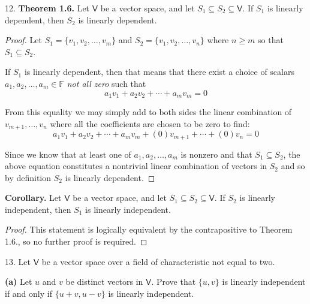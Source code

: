\documentclass[11pt]{article}
\newcommand{\cbr}[1]{\{#1\}}
\begin{document}
12. \textbf{Theorem 1.6.} Let $\mathsf{V}$ be a vector space, and let $S_1\subseteq S_2 \subseteq \mathsf{V}$. If $S_1$ is linearly dependent, then $S_2$ is linearly dependent.

\begin{proof} Let $S_1 = \cbr{v_1,v_2,\dots,v_m}$ and $S_2 = \cbr{v_1,v_2,\dots,v_n}$ where $n\geq m$ so that $S_1\subseteq S_2$.

    If $S_1$ is linearly dependent, then that means that there exist a choice of scalars $a_1,a_2,\dots,a_m\in\mathbb{F}$ \textit{not all zero} such that $$a_1v_1+a_2v_2+\cdots+a_mv_m = 0$$

    From this equality we may simply add to both sides the linear combination of $v_{m+1},\dots,v_n$ where all the coefficients are chosen to be zero to find:
    $$a_1v_1+a_2v_2+\cdots+a_mv_m + (0)v_{m+1} + \cdots + (0)v_n = 0$$

    Since we know that at least one of $a_1,a_2,\dots,a_m$ is nonzero and that $S_1\subseteq S_2$, the above equation constitutes a nontrivial linear combination of vectors in $S_2$ and so by definition $S_2$ is linearly dependent.
\end{proof}

\textbf{Corollary.} Let $\mathsf{V}$ be a vector space, and let $S_1\subseteq S_2 \subseteq \mathsf{V}$. If $S_2$ is linearly independent, then $S_1$ is linearly independent.

\begin{proof}
    This statement is logically equivalent by the contrapositive to Theorem 1.6., so no further proof is required.
\end{proof}

13. Let $\mathsf{V}$ be a vector space over a field of characteristic not equal to two.

\textbf{(a)} Let $u$ and $v$ be distinct vectors in $\mathsf{V}$. Prove that $\cbr{u,v}$ is linearly independent if and only if $\cbr{u+v,u-v}$ is linearly independent.
\end{document}
